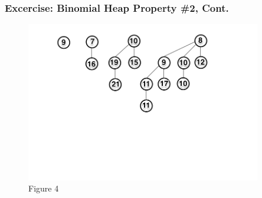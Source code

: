 \documentclass[13pt]{beamer}
\begin{document}
\begin{frame}
\frametitle{Excercise: Binomial Heap Property \#2, Cont.}

  \begin{figure}
        \caption{Figure 4}
        \includegraphics[height=7cm]{struct3.png}
      \end{figure}

\end{frame}
\end{document}
